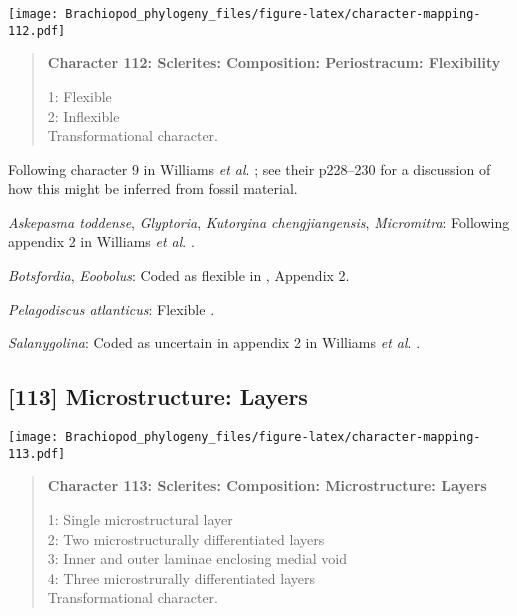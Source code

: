 \documentclass[openany]{book}
\theoremstyle{definition}
\theoremstyle{definition}
\theoremstyle{definition}
\theoremstyle{remark}
\begin{document}
\texttt{[image: Brachiopod\_phylogeny\_files/figure-latex/character-mapping-112.pdf]}

\begin{quote}
\textbf{Character 112: Sclerites: Composition: Periostracum:
Flexibility}

1: Flexible\\
2: Inflexible\\
Transformational character.
\end{quote}

Following character 9 in Williams \emph{et al}.
\citeyearpar{Williams1998Thediversity}; see their p228--230 for a
discussion of how this might be inferred from fossil material.

\hypertarget{Askepasma_toddense-coding-112}{}
\emph{Askepasma toddense}, \emph{Glyptoria}, \emph{Kutorgina
chengjiangensis}, \emph{Micromitra}: Following appendix 2 in Williams
\emph{et al}. \citeyearpar{Williams1998Thediversity}.

\hypertarget{Botsfordia-coding-112}{}
\emph{Botsfordia}, \emph{Eoobolus}: Coded as flexible in
\citet{Williams1998Thediversity}, Appendix 2.

\hypertarget{Pelagodiscus_atlanticus-coding-112}{}
\emph{Pelagodiscus atlanticus}: Flexible
\citep{Williams1998Thediversity}.

\hypertarget{Salanygolina-coding-112}{}
\emph{Salanygolina}: Coded as uncertain in appendix 2 in Williams
\emph{et al}. \citeyearpar{Williams1998Thediversity}.

\subsection*{{[}113{]} Microstructure:
Layers}\label{microstructure-layers}

\texttt{[image: Brachiopod\_phylogeny\_files/figure-latex/character-mapping-113.pdf]}

\begin{quote}
\textbf{Character 113: Sclerites: Composition: Microstructure: Layers}

1: Single microstructural layer\\
2: Two microstructurally differentiated layers\\
3: Inner and outer laminae enclosing medial void\\
4: Three microstrurally differentiated layers\\
Transformational character.
\end{quote}
\end{document}
